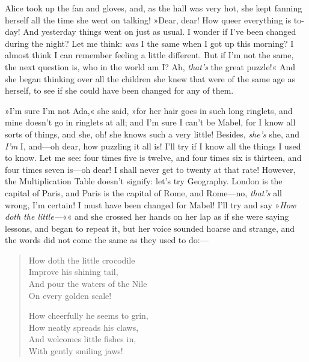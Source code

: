 Alice took up the fan and gloves, and, as the hall was very hot, she kept fanning herself all the time she went on talking! »Dear, dear! How queer everything is to-day! And yesterday things went on just as usual. I wonder if I've been changed during the night? Let me think: \textit{was} I the same when I got up this morning? I almost think I can remember feeling a little different. But if I'm not the same, the next question is, who in the world am I\@? Ah, \textit{that's} the great puzzle!« And she began thinking over all the children she knew that were of the same age as herself, to see if she could have been changed for any of them.

»I'm sure I'm not Ada,« she said, »for her hair goes in such long ringlets, and mine doesn't go in ringlets at all; and I'm sure I can't be Mabel, for I know all sorts of things, and she, oh! she knows such a very little! Besides, \textit{she's} she, and \textit{I'm} I, and—oh dear, how puzzling it all is! I'll try if I know all the things I used to know. Let me see: four times five is twelve, and four times six is thirteen, and four times seven is—oh dear! I shall never get to twenty at that rate! However, the Multiplication Table doesn't signify: let's try Geography. London is the capital of Paris, and Paris is the capital of Rome, and Rome—no, \textit{that's} all wrong, I'm certain! I must have been changed for Mabel! I'll try and say »\textit{How doth the little—}«« and she crossed her hands on her lap as if she were saying lessons, and began to repeat it, but her voice sounded hoarse and strange, and the words did not come the same as they used to do:—

\begin{verse}
	\begin{altverse}
How doth the little crocodile\\
Improve his shining tail,\\
And pour the waters of the Nile\\
On every golden scale!

How cheerfully he seems to grin,\\
How neatly spreads his claws,\\
And welcomes little fishes in,\\
With gently smiling jaws!\\
\end{altverse}
\end{verse}


